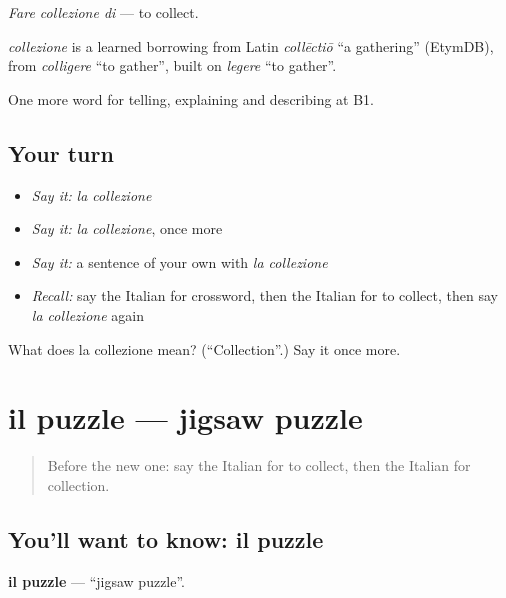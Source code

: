 \emph{Fare collezione di} — to collect.

\begin{cousinweb}
\emph{collezione} is a learned borrowing from Latin \emph{collēctiō} \textquotedblleft{}a gathering\textquotedblright{} (EtymDB), from \emph{colligere} \textquotedblleft{}to gather\textquotedblright{}, built on \emph{legere} \textquotedblleft{}to gather\textquotedblright{}.
\end{cousinweb}

\begin{grammarlens}[title={What you've built}]
One more word for telling, explaining and describing at B1.
\end{grammarlens}

\subsection*{Your turn}
\begin{itemize}
\raggedright
  \item \emph{Say it:} \emph{la collezione}
  \item \emph{Say it:} \emph{la collezione}, once more
  \item \emph{Say it:} a sentence of your own with \emph{la collezione}
  \item \emph{Recall:} say the Italian for crossword, then the Italian for to collect, then say \emph{la collezione} again
\end{itemize}

\begin{tcolorbox}[breakable,colback=teal!4,colframe=teal!35!black,title={Before you move on}]
What does la collezione mean? (\textquotedblleft{}Collection\textquotedblright{}.) Say it once more.
\end{tcolorbox}
\section[il puzzle]{il puzzle — jigsaw puzzle}

\label{lesson:IT-C505-puzzle}



\begin{quote}
Before the new one: say the Italian for to collect, then the Italian for collection.
\end{quote}

\subsection*{You'll want to know: il puzzle}
\textbf{il puzzle} — \textquotedblleft{}jigsaw puzzle\textquotedblright{}.

